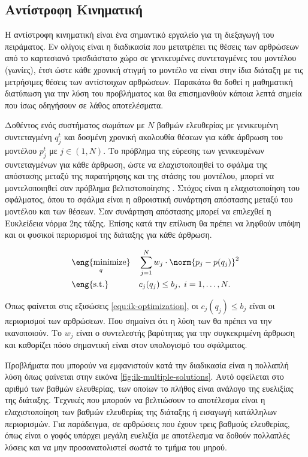 \subsection{Αντίστροφη Κινηματική}

Η αντίστροφη κινηματική είναι ένα σημαντικό εργαλείο για τη διεξαγωγή του πειράματος. Εν ολίγοις είναι η διαδικασία που μετατρέπει τις θέσεις των αρθρώσεων από το καρτεσιανό τρισδιάστατο χώρο σε γενικευμένες συντεταγμένες του μοντέλου (γωνίες), έτσι ώστε κάθε χρονική στιγμή το μοντέλο να είναι στην ίδια διάταξη με τις μετρήσιμες θέσεις των αντίστοιχων αρθρώσεων. Παρακάτω θα δοθεί η μαθηματική διατύπωση για την λύση του προβλήματος και θα επισημανθούν κάποια λεπτά σημεία που ίσως οδηγήσουν σε λάθος αποτελέσματα.

Δοθέντος ενός συστήματος σωμάτων με $Ν$ βαθμών ελευθερίας με γενικευμένη συντεταγμένη $q^{t}_{j}$ και δοσμένη χρονική ακολουθία θέσεων για κάθε άρθρωση του μοντέλου $p^{t}_{j}$ με $j \in (1, N)$. Το πρόβλημα της εύρεσης των γενικευμένων συντεταγμένων για κάθε άρθρωση, ώστε να ελαχιστοποιηθεί το σφάλμα της απόστασης μεταξύ της παρατήρησης και της στάσης του μοντέλου, μπορεί να μοντελοποιηθεί σαν πρόβλημα βελτιστοποίησης \cite{sherman13}. Στόχος είναι η ελαχιστοποίηση του σφάλματος, όπου το σφάλμα είναι η αθροιστική συνάρτηση απόστασης μεταξύ του μοντέλου και των θέσεων. Σαν συνάρτηση απόστασης μπορεί να επιλεχθεί η Ευκλείδεια νόρμα 2ης τάξης. Επίσης κατά την επίλυση θα πρέπει να ληφθούν υπόψη και οι φυσικοί περιορισμοί της διάταξης για κάθε άρθρωση.

\begin{equation}
    \begin{aligned}
        & \underset{q}{\text{\eng{minimize}}}
        & & \sum_{j=1}^{N} w_{j} \cdot \norm{p_{j} - p(q_{j})}^{2} \\
        & \text{\eng{s.t.}}
        & & c_{j}(q_{j}) \leq b_{j}, \; i = 1, \ldots, N.
    \end{aligned}
    \label{equ:ik-optimization}
\end{equation}

Όπως φαίνεται στις εξισώσεις \ref{equ:ik-optimization}, οι $c_{j}(q_{j}) \leq b_{j}$ είναι οι περιορισμοί των αρθρώσεων. Που σημαίνει ότι η λύση των  θα πρέπει να την ικανοποιούν. Το $w_{j}$ είναι ο συντελεστής βαρύτητας για την συγκεκριμένη άρθρωση και καθορίζει πόσο σημαντική είναι στον υπολογισμό του σφάλματος.

Προβλήματα που μπορούν να εμφανιστούν κατά την διαδικασία είναι η πολλαπλή λύση όπως φαίνεται στην εικόνα \ref{fig:ik-multiple-solutions}. Αυτό οφείλεται στο αριθμό των βαθμών ελευθερίας, των οποίων το πλήθος είναι ανάλογο της ευελιξίας της διάταξης. Τεχνικές που μπορούν να βελτιώσουν το αποτέλεσμα είναι η ελαχιστοποίηση των βαθμών ελευθερίας της διάταξης ή εισαγωγή κατάλληλων περιορισμών. Για παράδειγμα, σε αρθρώσεις που έχουν τρεις βαθμούς ελευθερίας, όπως είναι ο γοφός υπάρχει μεγάλη ευελιξία με αποτέλεσμα να δοθούν πολλαπλές λύσεις και να μην προσανατολιστεί σωστά το τμήμα του μηρού.

